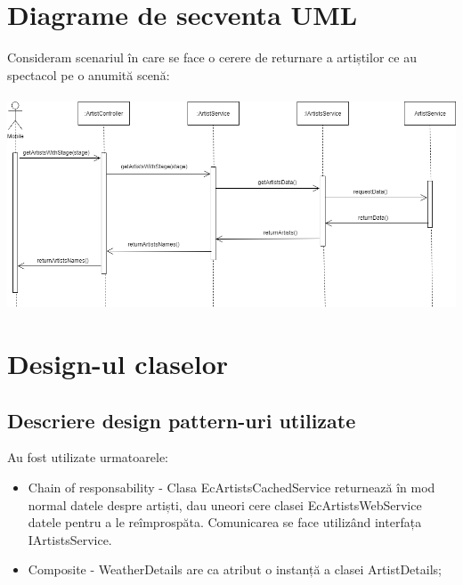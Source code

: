 \documentclass[11pt,a4paper,twoside,notitlepage]{article}
\begin{document}
\section{Diagrame de secventa UML}
Consideram scenariul în care se face o cerere de returnare a artiștilor ce au spectacol pe o anumită scenă: \\ \\
\includegraphics[width=.6\textheight]{secventa}


\section{Design-ul claselor}

\subsection{Descriere design pattern-uri utilizate}

Au fost utilizate urmatoarele:
\begin{itemize}
	\item Chain of responsability - Clasa EcArtistsCachedService returnează în mod normal datele despre artiști, dau uneori cere clasei EcArtistsWebService datele pentru a le reîmprospăta. Comunicarea se face utiliz\^{a}nd interfața IArtistsService.
	\item Composite - WeatherDetails are ca atribut o instanță a clasei ArtistDetails;
\end{itemize}
\end{document}
